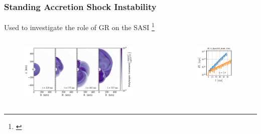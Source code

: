 \documentclass{beamer}
\begin{document}
\begin{frame}
\frametitle{Standing Accretion Shock Instability}

  Used \thornado{} to investigate the role of GR on the SASI%
  \footnote{\citet{dem2020,dem2023}}

  \begin{columns}[c]


      \begin{figure}[htb!]
        \centering
        \includegraphics[width=0.9\textwidth]{fig.sasi.png}
      \end{figure}


      \begin{figure}[htb!]
        \centering
        \includegraphics[width=0.9\textwidth]{fig.sasi_GRvNR.pdf}
      \end{figure}

  \end{columns}

\end{frame}
\end{document}
